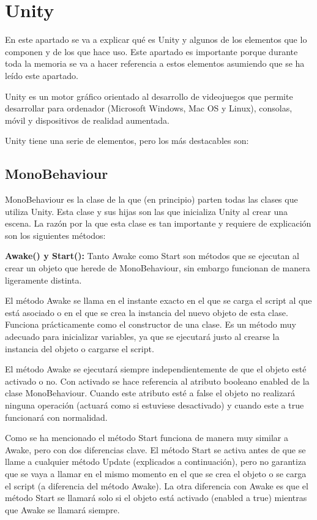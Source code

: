 
\section{Unity}
En este apartado se va a explicar qué es Unity y algunos de los elementos que lo componen y de los que hace uso. Este apartado es importante porque durante toda la memoria se va a hacer referencia a estos elementos asumiendo que se ha leído este apartado.

Unity es un motor gráfico orientado al desarrollo de videojuegos que permite desarrollar para ordenador (Microsoft Windows, Mac OS y Linux), consolas, móvil y dispositivos de realidad aumentada.

Unity tiene una serie de elementos, pero los más destacables son:

\subsection{MonoBehaviour \cite{ClaseMonobehaviour}}
MonoBehaviour es la clase de la que (en principio) parten todas las clases que utiliza Unity. Esta clase y sus hijas son las que inicializa Unity al crear una escena. La razón por la que esta clase es tan importante y requiere de explicación son los siguientes métodos:

\textbf{Awake() y Start():} Tanto Awake como Start son métodos que se ejecutan al crear un objeto que herede de MonoBehaviour, sin embargo funcionan de manera ligeramente distinta. 

El método Awake se llama en el instante exacto en el que se carga el script al que está asociado o en el que se crea la instancia del nuevo objeto de esta clase. Funciona prácticamente como el constructor de una clase. Es un método muy adecuado para inicializar variables, ya que se ejecutará justo al crearse la instancia del objeto o cargarse el script. 

El método Awake se ejecutará siempre independientemente de que el objeto esté activado o no. Con activado se hace referencia al atributo booleano enabled de la clase MonoBehaviour. Cuando este atributo esté a false el objeto no realizará ninguna operación (actuará como si estuviese desactivado) y cuando este a true funcionará con normalidad.

Como se ha mencionado el método Start funciona de manera muy similar a Awake, pero con dos diferencias clave. El método Start se activa antes de que se llame a cualquier método Update (explicados a continuación), pero no garantiza que se vaya a llamar en el mismo momento en el que se crea el objeto o se carga el script (a diferencia del método Awake). La otra diferencia con Awake es que el método Start se llamará solo si el objeto está activado (enabled a true) mientras que Awake se llamará siempre.\\


